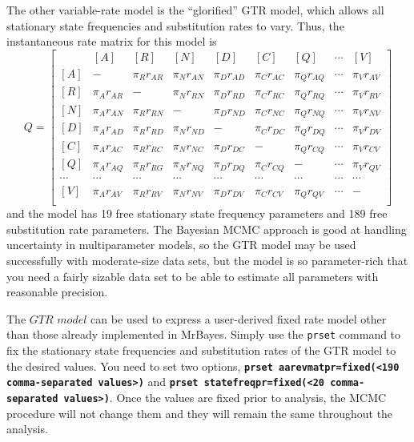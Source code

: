 \documentclass[12pt]{book}
\newcommand{\ttt}[1]{\texttt{#1}}
\newcommand{\tb}[1]{\ttt{\textbf{#1}}}
\begin{document}
The other variable-rate model is the ``glorified'' GTR model, which allows all stationary state
frequencies and substitution rates to vary. Thus, the instantaneous rate matrix for this model is
\[
Q=\begin{bmatrix}
    & [A] & [R] & [N] & [D] & [C] & [Q] & \cdots & [V]\\
 [A]& - & \pi_{R} r_{AR}& \pi_{N} r_{AN} & \pi_{D} r_{AD}& \pi_{C} r_{AC}& \pi_{Q} r_{AQ} & \cdots & \pi_V
r_{AV}\\
 [R]& \pi_{A} r_{AR} &- &  \pi_{N}  r_{RN}& \pi_{D} r_{RD}& \pi_{C} r_{RC}& \pi_{Q} r_{RQ} & \cdots & \pi_V
r_{RV}\\
 [N]& \pi_{A} r_{AN}&\pi_{R} r_{RN}&- &   \pi_{D} r_{ND}& \pi_{C} r_{NC}& \pi_{Q} r_{NQ} & \cdots & \pi_V
r_{NV}\\
 [D]& \pi_{A} r_{AD} &\pi_{R} r_{RD} &  \pi_{N} r_{ND}&- &  \pi_{C} r_{DC}& \pi_{Q} r_{DQ} & \cdots & \pi_V
r_{DV}\\
 [C]& \pi_{A} r_{AC} &\pi_{R} r_{RC} &  \pi_{N} r_{NC}&  \pi_{D} r_{DC}&- & \pi_{Q} r_{CQ} & \cdots & \pi_V
r_{CV}\\
 [Q]& \pi_{A} r_{AQ} &\pi_{R} r_{RG} &  \pi_{N} r_{NQ}&  \pi_{D} r_{DQ}& \pi_{C} r_{CQ} &- & \cdots & \pi_V
r_{QV}\\
 \cdots& \cdots& \cdots& \cdots& \cdots& \cdots& \cdots& \cdots& \cdots\\
 [V]& \pi_{A} r_{AV} &\pi_{R} r_{RV} &  \pi_{N} r_{NV}&  \pi_{D} r_{DV}& \pi_{C} r_{CV} &\pi_Q r_{QV}&
\cdots &- \\
\end{bmatrix}
\]
and the model has 19 free stationary state frequency parameters and 189 free substitution rate
parameters. The Bayesian MCMC approach is good at handling uncertainty in multiparameter models, so
the GTR model may be used successfully with moderate-size data sets, but the model is so
parameter-rich that you need a fairly sizable data set to be able to estimate all parameters with
reasonable precision.

The $GTR$ $model$ can be used to express a user-derived fixed rate model other than those already
implemented in MrBayes. Simply use the \ttt{prset} command to fix the stationary state frequencies
and substitution rates of the GTR model to the desired values. You need to set two options,
\tb{prset aarevmatpr=fixed(<190 comma-separated values>)} and \tb{prset statefreqpr=fixed(<20
comma-separated values>)}. Once the values are fixed prior to analysis, the MCMC procedure will not
change them and they will remain the same throughout the analysis.
\end{document}
